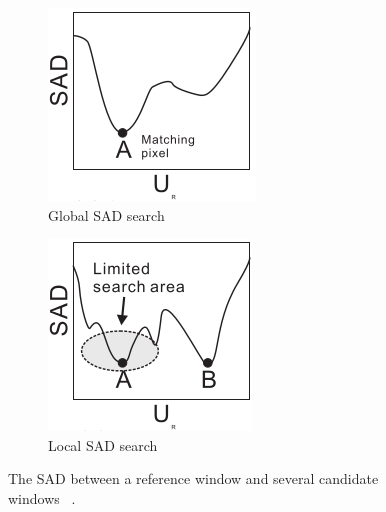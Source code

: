 \begin{figure}
\begin{center}
	\begin{subfigure}{0.4\textwidth}
		\includegraphics[width=\textwidth]{figures/sadGlobalGraph.png}
		\caption{Global SAD search}
		\label{fig:globalSAD}
	\end{subfigure}
	\begin{subfigure}{0.4\textwidth}
		\includegraphics[width=\textwidth]{figures/sadLocalGraph.png}
		\caption{Local SAD search}
		\label{fig:localSAD}
	\end{subfigure}
	\captionfonts
	\caption{The SAD between a reference window and several candidate windows ~\cite{sadParallel}.}
	\label{fig:sadGraphs}
\end{center}
\end{figure}



